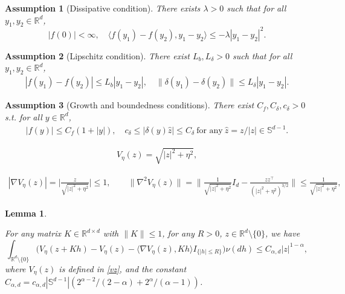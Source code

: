 \documentclass[10pt,a4paper]{amsart}
\newtheorem{assumption}{Assumption}
\newtheorem{lemma}{Lemma}
\newcommand{\de}{\delta}
\newcommand{\s}{\mathbb{S}}
\begin{document}
\begin{assumption}[Dissipative condition]\label{dis}
 There exists $\lambda>0$ such that for all
 $y_1,y_2\in\mathbb{R}^{d}$,
\begin{equation}\label{2.2}
|f(0)|<\infty,  \quad	\langle f(y_1)-f(y_2),y_1-y_2\rangle
\leq -\lambda |y_1-y_2|^2 .
\end{equation}		
\end{assumption}

\begin{assumption}[Lipschitz condition]\label{lip}
There exist $L_b,L_\delta>0$ such that for all
$y_1,y_2\in\mathbb{R}^{d}$,
	\begin{align*}
		|f(y_{1})-f(y_{2})| \leq L_b|y_{1}-y_{2}|,
		\quad	\|\delta(y_1)-\delta(y_2)\|
		\leq L_\delta |y_1-y_2|.
	\end{align*}
\end{assumption}

\begin{assumption}[Growth and boundedness conditions]\label{gro-bou}
There exist $C_f,C_\delta,c_\delta>0$ s.t.  for all
$y\in\mathbb{R}^{d}$,
\begin{align*}
 |f(y)| \leq C_{f}(1+|y|),\quad   
 c_\delta\le|\de(y) \hat{z}|\le C_\delta \ \text{for any}\ \hat{z}=z/|z|\in\s^{d-1}.
\end{align*}
\end{assumption}

\begin{align}\label{vz}
V_\eta(z)=\sqrt{|z|^2+\eta^2},
\end{align}

\begin{align}\label{grad}
	|\nabla V_\eta(z)|
	=\bigg|\frac{z}{\sqrt{|z|^2+\eta^2}}\bigg|\leq1,\quad  \quad
	\|\nabla^2V_\eta(z)\|
	=\bigg\|\frac{1}{\sqrt{|z|^2+\eta^2}}I_{d}
	-\frac{zz^{\top}}
	{(|z|^2+\eta^2)^{3/2}}\bigg\|\leq
	\frac{1}{\sqrt{|z|^2+\eta^2}}, 
\end{align}

\begin{lemma}\label{v-A}
	
	For any matrix
	$K\in\mathbb R^{d\times d}$ with $\|K\|\leq1$, for any $R>0$, $ z\in \mathbb R^{d}\setminus\{0\}$,
	we have
	\begin{equation}\label{z1-2-A}
		\int_{\mathbb R^{d}\setminus\{0\}}\Big(V_\eta(z+Kh)-V_\eta(z)-\langle\nabla V_\eta(z),Kh\rangle
		I_{\{|h|\leq R\}}\Big)\nu(dh)\leq C_{\alpha,d}|z|^{1-\alpha},
	\end{equation}
	where $V_\eta(z)$ is defined in \eqref{vz}, and the constant $C_{\alpha,d}=
	c_{\alpha,d}|\mathbb S^{d-1}|
	\left(	2^{\alpha-2}/(2-\alpha)+2^{\alpha}/(\alpha-1)
	\right)$.%
\end{lemma}
\end{document}
